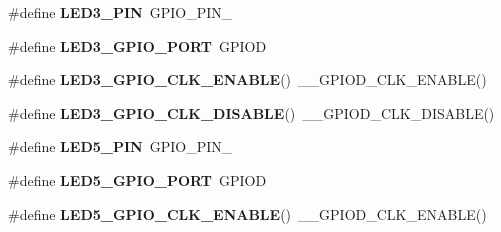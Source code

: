 \begin{DoxyCompactItemize}
\item 
\mbox{\label{group___s_t_m32_f4___d_i_s_c_o_v_e_r_y___l_o_w___l_e_v_e_l___l_e_d_ga4cb3ff938bcabb01494ce529ae55a542}} 
\#define {\bfseries L\+E\+D3\+\_\+\+P\+IN}~G\+P\+I\+O\+\_\+\+P\+I\+N\+\_
\item 
\mbox{\label{group___s_t_m32_f4___d_i_s_c_o_v_e_r_y___l_o_w___l_e_v_e_l___l_e_d_ga050f4b3a1f402476f9541dfe975d2143}} 
\#define {\bfseries L\+E\+D3\+\_\+\+G\+P\+I\+O\+\_\+\+P\+O\+RT}~G\+P\+I\+OD
\item 
\mbox{\label{group___s_t_m32_f4___d_i_s_c_o_v_e_r_y___l_o_w___l_e_v_e_l___l_e_d_gaac6c1162fc6bf1b60265e6fb7622e306}} 
\#define {\bfseries L\+E\+D3\+\_\+\+G\+P\+I\+O\+\_\+\+C\+L\+K\+\_\+\+E\+N\+A\+B\+LE}()~\+\_\+\+\_\+\+G\+P\+I\+O\+D\+\_\+\+C\+L\+K\+\_\+\+E\+N\+A\+B\+LE()
\item 
\mbox{\label{group___s_t_m32_f4___d_i_s_c_o_v_e_r_y___l_o_w___l_e_v_e_l___l_e_d_ga705278d726c1340f18576ca2d74f6e81}} 
\#define {\bfseries L\+E\+D3\+\_\+\+G\+P\+I\+O\+\_\+\+C\+L\+K\+\_\+\+D\+I\+S\+A\+B\+LE}()~\+\_\+\+\_\+\+G\+P\+I\+O\+D\+\_\+\+C\+L\+K\+\_\+\+D\+I\+S\+A\+B\+LE()
\item 
\mbox{\label{group___s_t_m32_f4___d_i_s_c_o_v_e_r_y___l_o_w___l_e_v_e_l___l_e_d_ga1461b79814613e21bc6ebb5d8ae6e858}} 
\#define {\bfseries L\+E\+D5\+\_\+\+P\+IN}~G\+P\+I\+O\+\_\+\+P\+I\+N\+\_
\item 
\mbox{\label{group___s_t_m32_f4___d_i_s_c_o_v_e_r_y___l_o_w___l_e_v_e_l___l_e_d_gae157f2a0e9c947288518e6124b82aa74}} 
\#define {\bfseries L\+E\+D5\+\_\+\+G\+P\+I\+O\+\_\+\+P\+O\+RT}~G\+P\+I\+OD
\item 
\mbox{\label{group___s_t_m32_f4___d_i_s_c_o_v_e_r_y___l_o_w___l_e_v_e_l___l_e_d_ga7bc0d4f9ca4f32399ed8bead5349a7b2}} 
\#define {\bfseries L\+E\+D5\+\_\+\+G\+P\+I\+O\+\_\+\+C\+L\+K\+\_\+\+E\+N\+A\+B\+LE}()~\+\_\+\+\_\+\+G\+P\+I\+O\+D\+\_\+\+C\+L\+K\+\_\+\+E\+N\+A\+B\+LE()

\end{DoxyCompactItemize}
